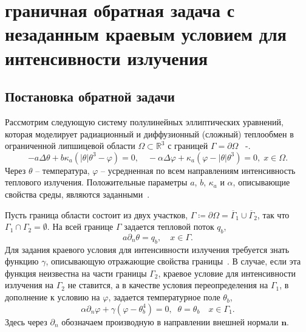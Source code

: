 \section{граничная обратная задача с незаданным
краевым условием для интенсивности излучения}\label{sec:ch2_sec3}

\subsection{Постановка обратной задачи}\label{subsec:3_1_init}

Рассмотрим следующую систему полулинейных эллиптических уравнений, которая
моделирует радиационный и диффузионный (сложный) теплообмен в
ограниченной липшицевой области $\Omega\subset \mathbb{R}^3$ с границей
$\Gamma=\partial\Omega$ ~\cite{Pinnau07}-\cite{Kovt14-1}.
\begin{equation}
    \label{eq1}
    - a\Delta\theta + b\kappa_a(|\theta|\theta^3- \varphi)=0,   \quad
    -\alpha \Delta \varphi + \kappa_a(\varphi-|\theta|\theta^3)=0,\; x\in\Omega.
\end{equation}
Через $\theta$ -- температура,  $\varphi$ -- усредненная по всем
направлениям интенсивность теплового излучения.
Положительные параметры
$a$, $b$, $\kappa_a$ и $\alpha$, описывающие
свойства среды, являются заданными~\cite{Kovt14-1}.


Пусть граница области состоит из двух участков, $\Gamma \coloneqq \partial \Omega =\overline{\Gamma}_1 \cup \overline{\Gamma}_2$,
так что $\Gamma_1 \cap \Gamma_2 =  \emptyset$.
На всей границе $\Gamma$ задается тепловой поток $q_b$,
\begin{equation}
    \label{bc1}
    a\partial_n\theta = q_b, \quad x\in \Gamma.
\end{equation}
Для задания краевого условия для интенсивности излучения
требуется знать функцию $\gamma$, описывающую отражающие свойства границы~\cite{JVM-14}.
В случае, если эта функция неизвестна на части границы $\Gamma_2$,
краевое условие для интенсивности излучения на $\Gamma_2$ не ставится, а в качестве условия
переопределения на $\Gamma_1$, в дополнение к условию на
$\varphi$, задается температурное поле $\theta_b$,
\begin{equation}
    \label{bc2}
    \alpha\partial_n\varphi + \gamma (\varphi - \theta_b ^4 ) = 0,\;\;
    \theta=\theta_b\quad x\in \Gamma_1.
\end{equation}
Здесь через $\partial_n$ обозначаем производную в направлении
внешней нормали $\mathbf n$.

